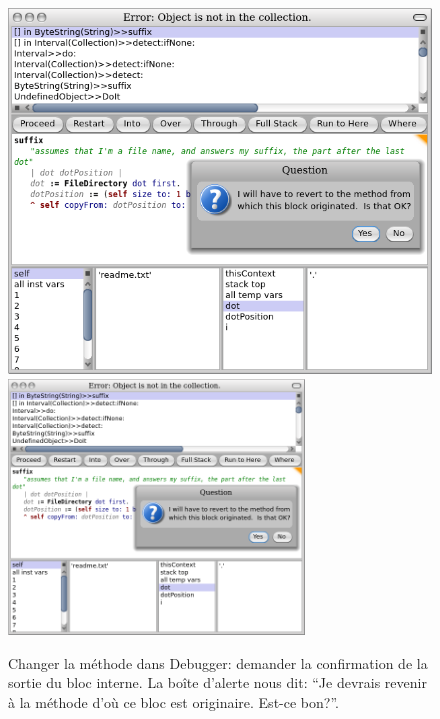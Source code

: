 \documentclass[a4paper,10pt,twoside]{book}
\begin{document}
\begin{figure}[btp]
 	\begin{center}
 	\ifluluelse
 		{\includegraphics[width=\textwidth]{revertDialog}}
 		{\includegraphics[width=0.7\textwidth]{revertDialog}}
 	\end{center}
 	\caption{Changer la méthode  dans Debugger: demander
      la confirmation de la sortie du bloc interne. La boîte
      d'alerte nous dit: ``Je devrais revenir à la méthode d'où ce bloc est originaire. Est-ce bon?''. }
 \end{figure}

\end{document}
